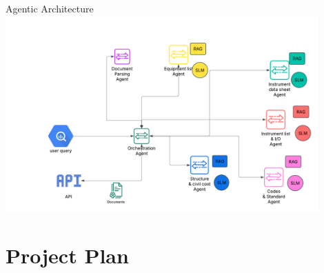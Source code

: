 \documentclass{beamer}
\begin{document}
\begin{frame}{Agentic Architecture}
    \centering
    \includegraphics[width=0.9\textwidth]{pics/agentic.png}
\end{frame}


\section{Project Plan}                                                                    
\end{document}
